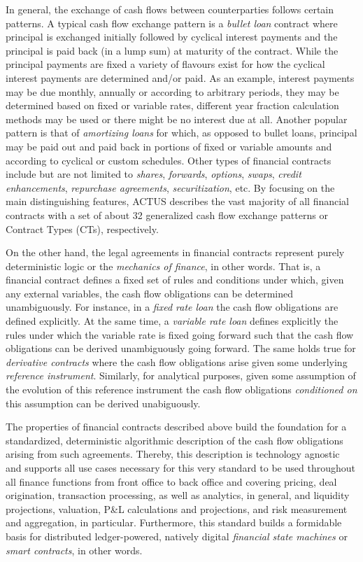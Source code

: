 \documentclass[9pt,oneside]{amsart}
\begin{document}
\begin{multicols}{2}
In general, the exchange of cash flows between counterparties follows certain patterns. A typical cash flow exchange pattern is a \textit{bullet loan} contract where principal is exchanged initially followed by cyclical interest payments and the principal is paid back (in a lump sum) at maturity of the contract. While the principal payments are fixed a variety of flavours exist for how the cyclical interest payments are determined and/or paid. As an example, interest payments may be due monthly, annually or according to arbitrary periods, they may be determined based on fixed or variable rates, different year fraction calculation methods may be used or there might be no interest due at all. Another popular pattern is that of \textit{amortizing loans} for which, as opposed to bullet loans, principal may be paid out and paid back in portions of fixed or variable amounts and according to cyclical or custom schedules. Other types of financial contracts include but are not limited to \textit{shares}, \textit{forwards}, \textit{options}, \textit{swaps}, \textit{credit enhancements}, \textit{repurchase agreements}, \textit{securitization}, etc. By focusing on the main distinguishing features, ACTUS describes the vast majority of all financial contracts with a set of about 32 generalized cash flow exchange patterns or Contract Types (CTs), respectively.

On the other hand, the legal agreements in financial contracts represent purely deterministic logic or the \textit{mechanics of finance}, in other words. That is, a financial contract defines a fixed set of rules and conditions under which, given any external variables, the cash flow obligations can be determined unambiguously. For instance, in a \textit{fixed rate loan} the cash flow obligations are defined explicitly. At the same time, a \textit{variable rate loan} defines explicitly the rules under which the variable rate is fixed going forward such that the cash flow obligations can be derived unambiguously going forward. The same holds true for \textit{derivative contracts} where the cash flow obligations arise given some underlying \textit{reference instrument}. Similarly, for analytical purposes, given some assumption of the evolution of this reference instrument the cash flow obligations \textit{conditioned on} this assumption can be derived unabiguously. 

The properties of financial contracts described above build the foundation for a standardized, deterministic algorithmic description of the cash flow obligations arising from such agreements. Thereby, this description is technology agnostic and supports all use cases necessary for this very standard to be used throughout all finance functions from front office to back office and covering pricing, deal origination, transaction processing, as well as analytics, in general, and liquidity projections, valuation, P\&L calculations and projections, and risk measurement and aggregation, in particular. Furthermore, this standard builds a formidable basis for distributed ledger-powered, natively digital \textit{financial state machines} or \textit{smart contracts}, in other words.



\end{multicols}
\end{document}

